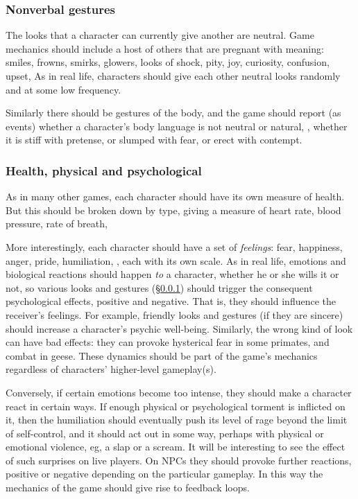 \subsubsection{Nonverbal gestures}
\label{sec:future:rules:nonverbal}

The looks that a character can currently give another are neutral.
Game mechanics should include a host of others that are pregnant with meaning:
smiles, frowns, smirks, glowers, looks of shock, pity, joy,
curiosity, confusion, upset,
\etc\@ As in real life, characters should give each other neutral looks
randomly and at some low frequency.

Similarly there should be gestures of the body, and the game should report
(as events) whether a character's body language is not neutral or natural, \eg,
whether it is stiff with pretense, or slumped with fear, or erect with contempt.

\subsubsection{Health, physical and psychological}

As in many other games, each character should have its own measure of health.
But this should be broken down by type, giving a measure of heart rate,
blood pressure, rate of breath, \etc

More interestingly, each character should have a set of {\em feelings}:
fear, happiness, anger, pride, humiliation, \etc, each with its own scale.
As in real life, emotions and biological reactions should happen {\em to} a
character, whether he or she wills it or not, so various looks and
gestures (\S\ref{sec:future:rules:nonverbal}) should trigger the consequent
psychological effects, positive and negative.
That is, they should influence the receiver's feelings.
For example, friendly looks and gestures (if they are sincere) should increase
a character's psychic well-being.
Similarly, the wrong kind of look can have bad effects: they can provoke
hysterical fear in some primates, and combat in geese.
These dynamics should be part of the game's mechanics regardless
of characters' higher-level gameplay(s).

Conversely, if certain emotions become too intense, they should make a
character react in certain ways.
If enough physical or psychological torment is inflicted on it, then the
humiliation should eventually push its level of rage beyond the limit of
self-control, and it should act out in some way, perhaps with physical or
emotional violence, eg, a slap or a scream.
It will be interesting to see the effect of such surprises on live players.
On NPCs they should provoke further reactions,
positive or negative depending on the particular gameplay.
In this way the mechanics of the game should give rise to feedback loops.

